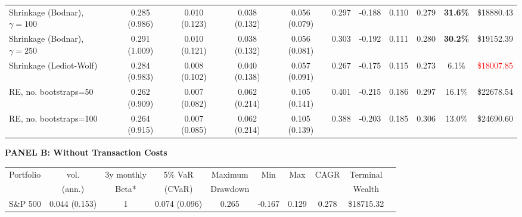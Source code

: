 \documentclass[12pt,letterpaper]{article}
\begin{document}
\begin{landscape}
\begin{table}[ht]
{\begin{tabular}{lcccccccccc}

Shrinkage (Bodnar), $\gamma=100$
& 0.285 (0.986) 
& 0.010 (0.123) 
& 0.038 (0.132)
& 0.056 (0.079) 
& 0.297
& -0.188
& 0.110
& 0.279
& \textbf{31.6\%}
& \textcolor{mygreen}{\$18880.43} \\

Shrinkage (Bodnar), $\gamma=250$
& 0.291 (1.009) 
& 0.010 (0.121) 
& 0.038 (0.132)
& 0.056 (0.081) 
& 0.303 
& -0.192
& 0.111
& 0.280 
& \textbf{30.2\%}
& \textcolor{mygreen}{\$19152.39} \\

Shrinkage (Lediot-Wolf)
& 0.284 (0.983) 
& 0.008 (0.102) 
& 0.040 (0.138)
& 0.057 (0.091) 
& 0.267 
& -0.175
& 0.115
& 0.273
& 6.1\%
& \textcolor{red}{\$18007.85} \\

RE, no. bootstraps=50
& 0.262 (0.909) 
& 0.007 (0.082) 
& 0.062 (0.214)
& 0.105 (0.141) 
& 0.401
& -0.215 
& 0.186 
& 0.297 
& 16.1\%
& \textcolor{mygreen}{\$22678.54} \\

RE, no. bootstraps=100
& 0.264 (0.915) 
& 0.007 (0.085) 
& 0.062 (0.214)
& 0.105 (0.139)
& 0.388
& -0.203
& 0.185
& 0.306
& 13.0\%
& \textcolor{mygreen}{\$24690.60} \\

\bottomrule
\end{tabular}
}

\vspace{0.5cm} %

{\footnotesize

\textbf{PANEL B: Without Transaction Costs} \\

\begin{tabular}{lccccccccc}
\toprule
Portfolio & vol. & 3y monthly & 5\% VaR & Maximum & Min & Max & CAGR & Terminal \\
       & (ann.) & Beta* & (CVaR) & Drawdown & & & & Wealth \\
\midrule

S\&P 500 
& 0.044 (0.153)
& 1
& 0.074 (0.096) 
& 0.265
& -0.167 
& 0.129 
& 0.278 
& \$18715.32 \\


\end{tabular}}
\end{table}
\end{landscape}
\end{document}
